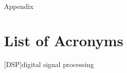\documentclass[reqno,onecolumn,oneside]{paper}
\newcommand{\<}{\ensuremath{\langle}}
\renewcommand{\>}{\ensuremath{\rangle}}
\begin{document}
\newpage

\appendix

\begin{center}
{\textsc Appendix}
\end{center}

\section*{List of Acronyms}
\begin{acronym}
[DSP]{digital signal processing}
\end{acronym}




\end{document}

